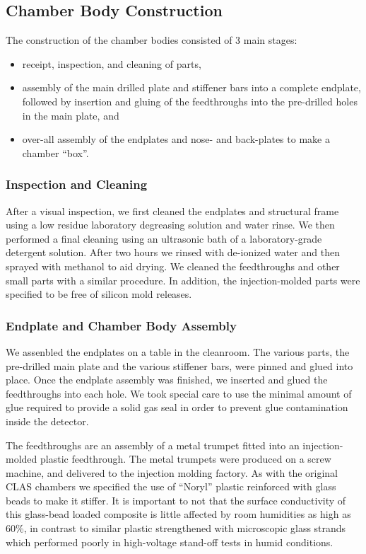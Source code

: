 \subsection{Chamber Body Construction}

The construction of the chamber bodies consisted of 3 main stages:
\begin{itemize}
\item receipt, inspection, and cleaning of parts,
\item assembly of the main drilled plate and stiffener bars into a complete endplate,
followed by insertion and gluing of the feedthroughs into the pre-drilled holes 
in the main plate, and 
\item over-all assembly of the endplates and nose- and back-plates to make
a chamber ``box''.
\end{itemize}

\subsubsection{Inspection and Cleaning}

After a visual inspection, we first cleaned the endplates and structural 
frame using a low residue laboratory degreasing solution and water rinse.
We then performed a final cleaning using an ultrasonic bath of a laboratory-grade detergent solution.  
After two hours we rinsed with de-ionized water and then sprayed 
with methanol to aid drying.
We cleaned the feedthroughs and other small parts with a similar procedure.
In addition, the injection-molded parts were specified to be free of silicon 
mold releases.
 
\subsubsection{Endplate and Chamber Body Assembly}

We assenbled the endplates on a table in the cleanroom.  The various parts,
the pre-drilled main plate and the various stiffener bars, were pinned
and glued into place.  Once the endplate assembly was finished,
we inserted and glued the feedthroughs into each hole.  We took special care 
to use the minimal amount of glue required to provide a solid gas 
seal in order to prevent glue contamination inside the detector. 

The feedthroughs are an assembly of a metal trumpet fitted into an injection-molded 
plastic feedthrough.  The metal trumpets were produced on a screw machine, and 
delivered to the injection molding factory.
As with the original CLAS chambers we specified the use of
``Noryl'' plastic reinforced with glass beads to make it stiffer.
It is important to not that the surface conductivity
of this glass-bead loaded composite is little affected by room humidities
as high as 60\%, in contrast to similar plastic strengthened
with microscopic glass strands which performed poorly in high-voltage stand-off
tests in humid conditions.  

